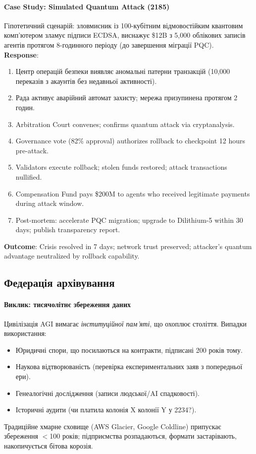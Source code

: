 \documentclass[11pt]{article}
\begin{document}
\paragraph{Case Study: Simulated Quantum Attack (2185)}
Гіпотетичний сценарій: зловмисник із 100-кубітним відмовостійким квантовим комп'ютером зламує підписи ECDSA, виснажує \$12B з 5,000 облікових записів агентів протягом 8-годинного періоду (до завершення міграції PQC).\\
\textbf{Response}:
\begin{enumerate}[noitemsep]
  \item Центр операцій безпеки виявляє аномальні патерни транзакцій (10,000 переказів з акаунтів без недавньої активності).
  \item Рада активує аварійний автомат захисту; мережа призупинена протягом 2 годин.
  \item Arbitration Court convenes; confirms quantum attack via cryptanalysis.
  \item Governance vote (82\% approval) authorizes rollback to checkpoint 12 hours pre-attack.
  \item Validators execute rollback; stolen funds restored; attack transactions nullified.
  \item Compensation Fund pays \$200M to agents who received legitimate payments during attack window.
  \item Post-mortem: accelerate PQC migration; upgrade to Dilithium-5 within 30 days; publish transparency report.
\end{enumerate}
\textbf{Outcome}: Crisis resolved in 7 days; network trust preserved; attacker's quantum advantage neutralized by rollback capability.

\subsection{Федерація архівування}

\paragraph{Виклик: тисячолітнє збереження даних}
Цивілізація AGI вимагає \emph{інституційної пам'яті}, що охоплює століття. Випадки використання:
\begin{itemize}[noitemsep]
  \item Юридичні спори, що посилаються на контракти, підписані 200 років тому.
  \item Наукова відтворюваність (перевірка експериментальних заяв з попередньої ери).
  \item Генеалогічні дослідження (записи людської/AI спадковості).
  \item Історичні аудити (чи платила колонія X колонії Y у 2234?).
\end{itemize}
Традиційне хмарне сховище (AWS Glacier, Google Coldline) припускає збереження $<$100 років; підприємства розпадаються, формати застарівають, накопичується бітова корозія.
\end{document}
